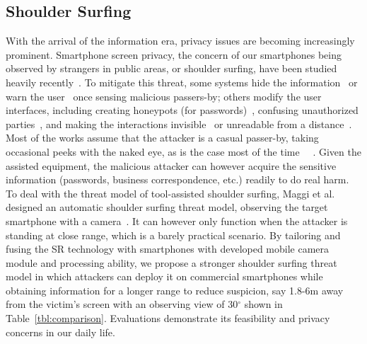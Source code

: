 \subsection{Shoulder Surfing}
With the arrival of the information era, privacy issues are becoming increasingly prominent. Smartphone screen privacy, the concern of our smartphones being observed by strangers in public areas, or shoulder surfing, have been studied heavily recently~\cite{eiband2017understanding,goucher2011look,kwon2013covert}. To mitigate this threat, some systems hide the information~\cite{brudy2014anyone} or warn the user~\cite{saad2018communicating} once sensing malicious passers-by; others modify the user interfaces, including creating honeypots (for passwords)~\cite{chakraborty2014tag}, confusing unauthorized parties~\cite{wiedenbeck2006design}, and making the interactions invisible~\cite{kumar2007reducing} or unreadable from a distance~\cite{Chun2019Keep}. Most of the works assume that the attacker is a casual passer-by, taking occasional peeks with the naked eye, as is the case most of the time~\cite{eiband2017understanding} ~\cite{wiedenbeck2006design}. Given the assisted equipment, the malicious attacker can however acquire the sensitive information (passwords, business correspondence, etc.) readily to do real harm. To deal with the threat model of tool-assisted shoulder surfing,%
Maggi et al. designed an automatic shoulder surfing threat model, observing the target smartphone with a camera~\cite{maggi2011poster}. It can however only function when the attacker is standing at close range, which is a barely practical scenario. By tailoring and fusing the SR technology with smartphones with developed mobile camera module and processing ability, we propose a stronger shoulder surfing threat model in which attackers can deploy it on commercial smartphones while obtaining information for a longer range to reduce suspicion, say 1.8-6m away from the victim's screen with an observing view of 30$^\circ$ shown in Table~\ref{tbl:comparison}. Evaluations demonstrate its feasibility and privacy concerns in our daily life.

